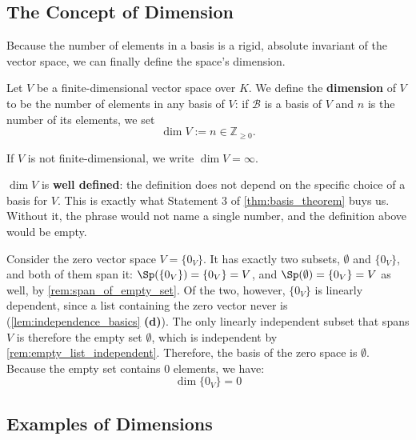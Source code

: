 \subsection{The Concept of Dimension}

Because the number of elements in a basis is a rigid, absolute invariant of the vector space, we can finally define the space's dimension.

\begin{definition}[Dimension]
\label{def:dimension}
Let $V$ be a finite-di\-men\-sional vector space over $K$. We define the \textbf{dimension} of $V$ to be the number of elements in any basis of $V$: if $\mathcal{B}$ is a basis of $V$ and $n$ is the number of its elements, we set
\[
\dim V := n \in \mathbb{Z}_{\ge 0}.
\]

If $V$ is not finite-di\-men\-sional, we write $\dim V = \infty$.
\end{definition}

\begin{importantremark}
\label{rem:dimension_well_defined}
$\dim V$ is \textbf{well defined}: the definition does not depend on the specific choice of a basis for $V$. This is exactly what Statement 3 of \cref{thm:basis_theorem} buys us. Without it, the phrase  would not name a single number, and the definition above would be empty.
\end{importantremark}

\begin{remark}
\label{rem:dimension_of_zero_space}
Consider the zero vector space $V = \{0_V\}$. It has exactly two subsets, $\emptyset$ and $\{0_V\}$, and both of them span it: $\Sp(\{0_V\}) = \{0_V\} = V$, and $\Sp(\emptyset) = \{0_V\} = V$ as well, by \cref{rem:span_of_empty_set}. Of the two, however, $\{0_V\}$ is linearly dependent, since a list containing the zero vector never is (\cref{lem:independence_basics} \textbf{(d)}). The only linearly independent subset that spans $V$ is therefore the empty set $\emptyset$, which is independent by \cref{rem:empty_list_independent}.
Therefore, the basis of the zero space is $\emptyset$. Because the empty set contains $0$ elements, we have:
\[
\dim \{0_V\} = 0
\]
\end{remark}

\subsection{Examples of Dimensions}

